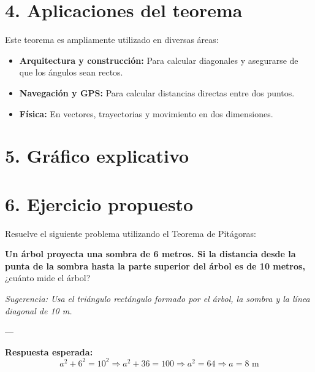 \documentclass[11pt]{article}
\begin{document}
\section*{4. Aplicaciones del teorema}

Este teorema es ampliamente utilizado en diversas áreas:

\begin{itemize}
    \item \textbf{Arquitectura y construcción:} Para calcular diagonales y asegurarse de que los ángulos sean rectos.
    \item \textbf{Navegación y GPS:} Para calcular distancias directas entre dos puntos.
    \item \textbf{Física:} En vectores, trayectorias y movimiento en dos dimensiones.
\end{itemize}

\section*{5. Gráfico explicativo}

\begin{center}
\end{center}

\section*{6. Ejercicio propuesto}

Resuelve el siguiente problema utilizando el Teorema de Pitágoras:

\textbf{Un árbol proyecta una sombra de 6 metros. Si la distancia desde la punta de la sombra hasta la parte superior del árbol es de 10 metros,} ¿cuánto mide el árbol?

\vspace{0.2cm}
\noindent
\textit{Sugerencia: Usa el triángulo rectángulo formado por el árbol, la sombra y la línea diagonal de 10 m.}

---

\noindent
\textbf{Respuesta esperada:}
\[
a^2 + 6^2 = 10^2 \Rightarrow a^2 + 36 = 100 \Rightarrow a^2 = 64 \Rightarrow a = 8\text{ m}
\]
\end{document}
